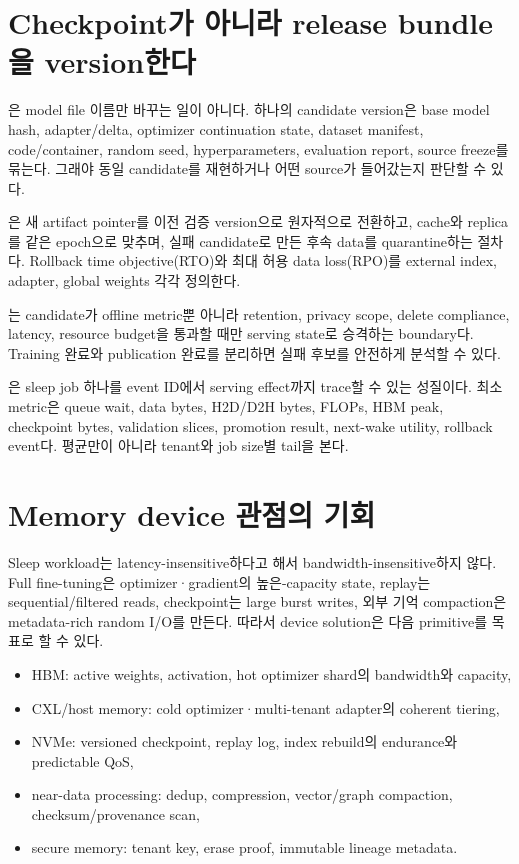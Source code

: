 \section{Checkpoint가 아니라 release bundle을 version한다}

은 model file 이름만 바꾸는 일이 아니다. 하나의 candidate version은
base model hash, adapter/delta, optimizer continuation state, dataset manifest, code/container, random seed,
hyperparameters, evaluation report, source freeze를 묶는다. 그래야 동일 candidate를 재현하거나 어떤
source가 들어갔는지 판단할 수 있다.

은 새 artifact pointer를 이전 검증 version으로 원자적으로 전환하고, cache와
replica를 같은 epoch으로 맞추며, 실패 candidate로 만든 후속 data를 quarantine하는 절차다. Rollback
time objective(RTO)와 최대 허용 data loss(RPO)를 external index, adapter, global weights 각각 정의한다.

는 candidate가 offline metric뿐 아니라 retention, privacy scope,
delete compliance, latency, resource budget을 통과할 때만 serving state로 승격하는 boundary다. Training
완료와 publication 완료를 분리하면 실패 후보를 안전하게 분석할 수 있다.

은 sleep job 하나를 event ID에서 serving effect까지 trace할 수 있는
성질이다. 최소 metric은 queue wait, data bytes, H2D/D2H bytes, FLOPs, HBM peak, checkpoint bytes,
validation slices, promotion result, next-wake utility, rollback event다. 평균만이 아니라 tenant와 job size별
tail을 본다.

\section{Memory device 관점의 기회}

Sleep workload는 latency-insensitive하다고 해서 bandwidth-insensitive하지 않다. Full fine-tuning은
optimizer·gradient의 높은-capacity state, replay는 sequential/filtered reads, checkpoint는 large burst
writes, 외부 기억 compaction은 metadata-rich random I/O를 만든다. 따라서 device solution은 다음
primitive를 목표로 할 수 있다.

\begin{itemize}
  \item HBM: active weights, activation, hot optimizer shard의 bandwidth와 capacity,
  \item CXL/host memory: cold optimizer·multi-tenant adapter의 coherent tiering,
  \item NVMe: versioned checkpoint, replay log, index rebuild의 endurance와 predictable QoS,
  \item near-data processing: dedup, compression, vector/graph compaction, checksum/provenance scan,
  \item secure memory: tenant key, erase proof, immutable lineage metadata.
\end{itemize}

